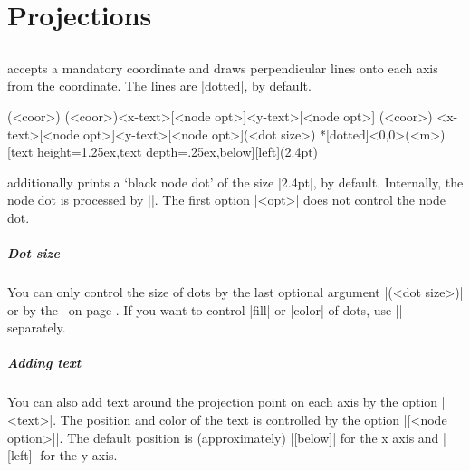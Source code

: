 \chapter{Projections}
\label{c:projections}

\section{\protect\cmd{\tzproj(*)}}
\label{s:tzproj}

\icmd{\tzproj} accepts a mandatory coordinate and draws perpendicular lines onto each axis from the coordinate. The lines are |dotted|, by default.

\begin{tzdef}{}
  \tzproj(<coor>)
  \tzproj*(<coor>){<x-text>}[<node opt>]{<y-text>}[<node opt>]
  (<coor>)
         {<x-text>}[<node opt>]{<y-text>}[<node opt>](<dot size>)
 *[dotted]<0,0>(<m>){}[text height=1.25ex,text depth=.25ex,below]{}[left](2.4pt)
\end{tzdef}

\icmd{\tzproj*} additionally prints a `black node dot' of the size |2.4pt|, by default.
Internally, the node dot is processed by |\tzdot*|.
The first option |<opt>| does not control the node dot.

\paragraph{Dot size}
You can only control the size of dots by the last optional argument |(<dot size>)| or by the \threeways\ on page \pageref{ss:threeways}.
If you want to control |fill| or |color| of dots, use |\tzdot*| separately.

\begin{tzcode}{.3}
\end{tzcode}

\paragraph{Adding text}
You can also add text around the projection point on each axis by the option |{<text>}|.
The position and color of the text is controlled by the option |[<node option>]|.
The default position is (approximately) |[below]| for the x axis and |[left]| for the y axis.


